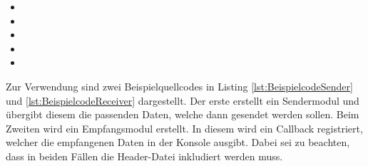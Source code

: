 \begin{itemize}
\item {} 
\item {}
\item {}
\item {}
\item {}
\end{itemize}

Zur Verwendung sind zwei Beispielquellcodes in Listing
\ref{lst:BeispielcodeSender} und \ref{lst:BeispielcodeReceiver} dargestellt. Der
erste erstellt ein Sendermodul und {\"u}bergibt diesem die passenden Daten,
welche dann gesendet werden sollen. Beim Zweiten wird ein Empfangsmodul
erstellt.
In diesem wird ein Callback registriert, welcher die empfangenen Daten in der
Konsole ausgibt. Dabei sei zu beachten, dass in beiden F{\"a}llen die
Header-Datei  inkludiert werden muss.

\newpage

\lstset{language=C++}


\lstset{language=C++}
